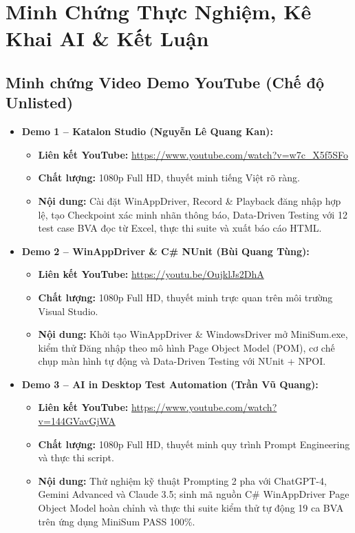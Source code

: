 \section{Minh Chứng Thực Nghiệm, Kê Khai AI \& Kết Luận}

\subsection{Minh chứng Video Demo YouTube (Chế độ Unlisted)}
\begin{itemize}
    \item \textbf{Demo 1 -- Katalon Studio (Nguyễn Lê Quang Kan):}
    \begin{itemize}
        \item \textbf{Liên kết YouTube:} \url{https://www.youtube.com/watch?v=w7c_X5f5SFo}
        \item \textbf{Chất lượng:} 1080p Full HD, thuyết minh tiếng Việt rõ ràng.
        \item \textbf{Nội dung:} Cài đặt WinAppDriver, Record \& Playback đăng nhập hợp lệ, tạo Checkpoint xác minh nhãn thông báo, Data-Driven Testing với 12 test case BVA đọc từ Excel, thực thi suite và xuất báo cáo HTML.
    \end{itemize}
    \item \textbf{Demo 2 -- WinAppDriver \& C\# NUnit (Bùi Quang Tùng):}
    \begin{itemize}
        \item \textbf{Liên kết YouTube:} \url{https://youtu.be/OujklJs2DhA}
        \item \textbf{Chất lượng:} 1080p Full HD, thuyết minh trực quan trên môi trường Visual Studio.
        \item \textbf{Nội dung:} Khởi tạo WinAppDriver \& WindowsDriver mở MiniSum.exe, kiểm thử Đăng nhập theo mô hình Page Object Model (POM), cơ chế chụp màn hình tự động và Data-Driven Testing với NUnit + NPOI.
    \end{itemize}
    \item \textbf{Demo 3 -- AI in Desktop Test Automation (Trần Vũ Quang):}
    \begin{itemize}
        \item \textbf{Liên kết YouTube:} \url{https://www.youtube.com/watch?v=144GVavGjWA}
        \item \textbf{Chất lượng:} 1080p Full HD, thuyết minh quy trình Prompt Engineering và thực thi script.
        \item \textbf{Nội dung:} Thử nghiệm kỹ thuật Prompting 2 pha với ChatGPT-4, Gemini Advanced và Claude 3.5; sinh mã nguồn C\# WinAppDriver Page Object Model hoàn chỉnh và thực thi suite kiểm thử tự động 19 ca BVA trên ứng dụng MiniSum PASS 100\%.
    \end{itemize}
\end{itemize}

